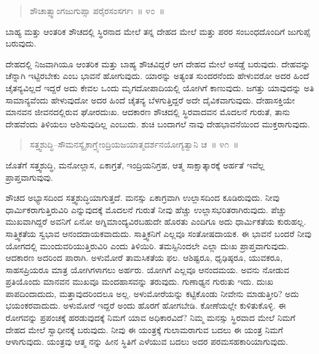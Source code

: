 \begin{verse}
ಶೌಚಾತ್ಸ್ವಾಂಗಜುಗುಪ್ಸಾ ಪರೈರಸಂಸರ್ಗಃ~॥ ೪೦~॥
\end{verse}

\vspace{-0.35cm}

ಬಾಹ್ಯ ಮತ್ತು ಆಂತರಿಕ ಶೌಚದಲ್ಲಿ ಸ್ಥಿರನಾದ ಮೇಲೆ ತನ್ನ ದೇಹದ ಮೇಲೆ ಮತ್ತು ಪರರ ಸಂಬಂಧದೊಂದಿಗೆ ಜುಗುಪ್ಸೆ ಬರುವುದು. 

ದೇಹದಲ್ಲಿ ನಿಜವಾಗಿಯೂ ಆಂತರಿಕ ಮತ್ತು ಬಾಹ್ಯ ಶೌಚವಿದ್ದರೆ ಆಗ ದೇಹದ ಮೇಲೆ ಅಸಡ್ಡೆ ಬರುವುದು. ದೇಹವನ್ನು ಚೆನ್ನಾಗಿ ಇಟ್ಟಿರಬೇಕು ಎಂಬ ಭಾವನೆ ಹೋಗುವುದು. ಯಾರನ್ನು ಅತ್ಯಂತ ಸುಂದರನೆಂದು ಹೇಳುವರೋ ಅದರ ಹಿಂದೆ ಚೈತನ್ಯವಿಲ್ಲದೆ ಇದ್ದರೆ ಅದು ಕೇವಲ ಒಂದು ಮೃಗದೋಪಾದಿಯಲ್ಲಿ ಯೋಗಿಗೆ ಕಾಣುವುದು. ಜಗತ್ತು ಯಾವುದನ್ನು ಅತಿ ಸಾಮಾನ್ಯವೆಂದು ಹೇಳುವುದೋ ಅದರ ಹಿಂದೆ ಚೈತನ್ಯ ಬೆಳಗುತ್ತಿದ್ದರೆ ಅದೇ ದೈವಿಕವಾಗುವುದು. ದೇಹಾಸಕ್ತಿಯೇ ಮಾನವನ ಜೀವನದಲ್ಲಿರುವ ಘೋರದುಃಖ. ಆದಕಾರಣ ಶೌಚದಲ್ಲಿ ಸ್ಥಿರವಾದವನ ಮೊದಲನೆ ಗುರುತೆ, ತಾನು ದೇಹವೆಂದು ತಿಳಿಯಲು ಆಶಿಸುವುದಿಲ್ಲ ಎಂಬುದು. ಶುಚಿ ಬಂದಾಗಲೆ ನಾವು ದೇಹಭಾವನೆಯಿಂದ ಮುಕ್ತರಾಗುವುದು. 

\vspace{-0.35cm}

\begin{verse}
ಸತ್ತ್ವಶುದ್ಧಿ–ಸೌಮನಸ್ಯೈಕಾಗ್ರ್ಯೇಂದ್ರಿಯಜಯಾತ್ಮದರ್ಶನಯೋಗ್ಯತ್ವಾನಿ ಚ~॥ ೪೧~॥
\end{verse}

\vspace{-0.35cm}

ಜೊತೆಗೆ ಸತ್ತ್ವಶುದ್ಧಿ, ಮನೋಲ್ಲಾಸ, ಏಕಾಗ್ರತೆ, ಇಂದ್ರಿಯನಿಗ್ರಹ, ಆತ್ಮ ಸಾಕ್ಷಾತ್ಕಾರಕ್ಕೆ ಅರ್ಹತೆ ಇವೆಲ್ಲ ಪ್ರಾಪ್ತವಾಗುವುವು. 

ಶೌಚದ ಅಭ್ಯಾಸದಿಂದ ಸತ್ತ್ವಶುದ್ಧಿಯಾಗುತ್ತದೆ. ಮನಸ್ಸು ಏಕಾಗ್ರವಾಗಿ ಉಲ್ಲಾಸದಿಂದ ಕೂಡಿರುವುದು. ನೀವು ಧಾರ್ಮಿಕರಾಗುತ್ತಿರುವಿರಿ ಎನ್ನುವುದಕ್ಕೆ ಮೊದಲನೆ ಗುರುತೆ ನೀವು ಹೆಚ್ಚು ಉಲ್ಲಾಸಭರಿತರಾಗಿರುವುದು. ಪೆಚ್ಚು ಮುಖವಾಗಿದ್ದರೆ ಅವನಿಗೆ ಏನೋ ಅಗ್ನಿಮಾಂದ್ಯವಿರಬಹುದೇ ಹೊರತು ಎಂದಿಗೂ ಅದು ಧಾರ್ಮಿಕತೆಯ ಕುರುಹಲ್ಲ. ಸಾತ್ತ್ವಿಕತೆಯ ಸ್ವಭಾವ ಆನಂದದಾಯಕವಾದುದು. ಸಾತ್ತ್ವಿಕನಿಗೆ ಎಲ್ಲವೂ ಸಂತೋಷದಾಯಕ. ಈ ಭಾವನೆ ಬಂದರೆ ನೀವು ಯೋಗದಲ್ಲಿ ಮುಂದುವರಿಯುತ್ತಿರುವಿರಿ ಎಂದು ತಿಳಿಯಿರಿ. ತಮಸ್ಸಿನಿಂದಲೇ ಎಲ್ಲಾ ದುಃಖ ಪ್ರಾಪ್ತವಾಗುವುದು. ಆದಕಾರಣ ಅದರಿಂದ ಪಾರಾಗಿ. ಅಳುಮೋರೆ ತಾಮಸಿಕತೆಯ ಫಲ. ಆಶಿಷ್ಟರೂ, ಧೃಢಿಷ್ಠರೂ, ಯುವಕರೂ, ಸಾಹಸಪ್ರಿಯರೂ ಮಾತ್ರ ಯೋಗಿಗಳಾಗಲು ಅರ್ಹರು. ಯೋಗಿಗೆ ಎಲ್ಲವೂ ಆನಂದ\break ಮಯ. ಅವನು ನೋಡುವ ಪ್ರತಿಯೊಂದು ಮಾನವನ ಮುಖವೂ ಮಂದಹಾಸವನ್ನು ತರುವುದು. ಗುಣಾಢ್ಯನ ಗುರುತು ಇದು. ದುಃಖ ಪಾಪದಿಂದಾದುದು, ಮತ್ತಾವುದರಿಂದಲೂ ಅಲ್ಲ. ಅಳುಮೋರೆಯನ್ನು ಕಟ್ಟಿಕೊಂಡು ನೀವೇನು ಮಾಡುತ್ತೀರಿ? ಅದು ಭಯಂಕರವಾದುದು. ಅಳುಮೋರೆ ಇದ್ದರೆ ಅಂದು ಹೊರಗೆ ಹೋಗಬೇಡಿ. ಕೋಣೆಯಲ್ಲೇ ಕುಳಿತುಕೊಳ್ಳಿ. ಈ ರೋಗವನ್ನು ಪ್ರಪಂಚಕ್ಕೆ ಹರಡುವುದಕ್ಕೆ ನಿಮಗೆ ಯಾವ ಅಧಿಕಾರವಿದೆ? ನಿಮ್ಮ ಮನಸ್ಸು ಸ್ಥಿರವಾದ ಮೇಲೆ ನಿಮಗೆ ದೇಹದ ಮೇಲೆ ಸ್ವಾಧೀನಕ್ಕೆ  ಬರುವುದು. ನೀವು ಈ ಯಂತ್ರಕ್ಕೆ ಗುಲಾಮರಾಗುವ ಬದಲು ಈ ಯಂತ್ರ ನಿಮಗೆ ಆಳಾಗುವುದು. ಯಂತ್ರವು ಆತ್ಮ ನನ್ನು ಹೀನ ಸ್ಥಿತಿಗೆ ಎಳೆಯುವ ಬದಲು ಅದರ ಪರಮಸಹಕಾರಿಯಾಗುವುದು. 

